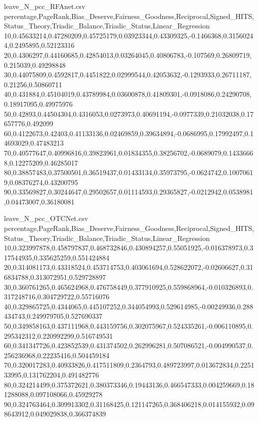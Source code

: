 \begin{filecontents*}{leave_N_pcc_RFAnet.csv}
percentage,PageRank,Bias_Deserve,Fairness_Goodness,Reciprocal,Signed_HITS,Status_Theory,Triadic_Balance,Triadic_Status,Linear_Regression
10,0.45633214,0.47280209,0.45725179,0.03923344,0.43309325,-0.1466368,0.31560244,0.2495895,0.52123316
20,0.4306297,0.44160685,0.42854013,0.03264045,0.40806783,-0.107569,0.26809719,0.215039,0.49298848
30,0.44075809,0.4592817,0.4451822,0.02999544,0.42053632,-0.1293933,0.26711187,0.21256,0.50860711
40,0.431884,0.45104019,0.43789984,0.03600878,0.41809301,-0.0918086,0.24290708,0.18917095,0.49975976
50,0.42893,0.44504304,0.4316053,0.0273973,0.40691194,-0.0977339,0.21032038,0.17657776,0.492099
60,0.4122673,0.42403,0.41133136,0.02469859,0.39634894,-0.0686995,0.17992497,0.14693029,0.47483213
70,0.40577647,0.40996816,0.39823961,0.01834355,0.38256702,-0.0689079,0.14336668,0.12275209,0.46285017
80,0.38857483,0.37500501,0.36519437,0.01433134,0.35973795,-0.0624742,0.10070619,0.08376274,0.43200795
90,0.33569827,0.30244647,0.29502657,0.01114593,0.29365827,-0.0212942,0.0538981,0.04473007,0.36180081
\end{filecontents*}

\begin{filecontents*}{leave_N_pcc_OTCNet.csv}
percentage,PageRank,Bias_Deserve,Fairness_Goodness,Reciprocal,Signed_HITS,Status_Theory,Triadic_Balance,Triadic_Status,Linear_Regression
10,0.323997878,0.458797837,0.468732846,0.430894257,0.55051925,-0.016378973,0.317544935,0.335625259,0.551424884
20,0.314081173,0.43318524,0.453714753,0.403061694,0.528622072,-0.02606627,0.316834788,0.313072951,0.529728897
30,0.360761265,0.465624968,0.476758449,0.377910925,0.559868964,-0.010326893,0.317248716,0.304729722,0.55716076
40,0.329865725,0.4344065,0.445107252,0.344054993,0.529614985,-0.00249936,0.288434743,0.249979705,0.527690337
50,0.349858163,0.437111968,0.443159756,0.302075967,0.524335261,-0.006110895,0.295342312,0.220992299,0.516749531
60,0.341347726,0.423852539,0.431374502,0.262996281,0.507086521,-0.004990537,0.256236968,0.22235416,0.504459184
70,0.320017283,0.40933826,0.417511809,0.2364793,0.489723997,0.013672834,0.225133995,0.131762204,0.491482776
80,0.324214499,0.375372621,0.380373346,0.19443136,0.466547333,0.004259669,0.181288088,0.097108066,0.45929278
90,0.324763464,0.309913302,0.31168425,0.121147265,0.368406218,0.014155932,0.098643912,0.049029838,0.366374839
\end{filecontents*}

